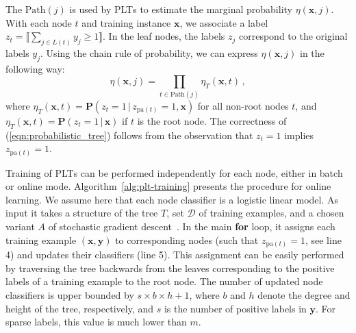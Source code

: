 \documentclass{article}
\newcommand{\Algo}[1]{\textsc{#1}}
\renewcommand{\vec}[1]{\boldsymbol{#1}}
\newcommand{\bx}{\vec{x}}
\newcommand{\by}{\vec{y}}
\newcommand{\calD}{\mathcal{D}}
\newcommand{\heta}{\hat{\eta}}
\newcommand{\pa}[1]{\mathrm{pa}(#1)}
\newcommand{\Path}[1]{\mathrm{Path}(#1)}
\newcommand{\prob}{\mathbf{P}}
\newcommand{\assert}[1]{\llbracket #1 \rrbracket}
\newcommand{\given}{\, | \,}
\begin{document}
{The $\Path{j}$ is used by \Algo{PLT}s to estimate the marginal probability $\eta(\bx, j)$.
With each node $t$ and training instance $\bx$, we associate a label $z_t = \assert{\textstyle \sum_{j \in L(t)} y_j \ge 1}$.
In the leaf nodes, the labels $z_j$ correspond to the original labels $y_j$.
Using the chain rule of probability, we can express $\eta(\bx, j)$ in the following way:
\begin{equation}
\eta(\bx, j) = \prod_{t \in \Path{j}} \eta_T(\bx, t)\,,
\label{eqn:probabilistic_tree}
\end{equation}
where $\eta_T(\bx, t) = \prob(z_t = 1 \given z_{\pa{t}} =1, \bx)$ for all non-root nodes $t$, and $\eta_T(\bx, t) = \prob(z_t = 1 \given \bx)$ if $t$ is the root node. 
The correctness of (\ref{eqn:probabilistic_tree}) follows from the observation that $z_{t} = 1$ implies $z_{\pa{t}} = 1$. %

Training of \Algo{PLT}s can be performed independently for each node, either in batch or online mode.  Algorithm~\ref{alg:plt-training} presents the procedure for online learning. We assume here that each node classifier is a logistic linear model. As input it takes a structure of the tree $T$, set $\calD$ of training examples, and a chosen variant $A$ of stochastic gradient descent~\cite{Bottou_2010}. In the main \textbf{for} loop, it assigns each training example $(\bx, \by)$ to corresponding nodes (such that  $z_{\pa{t}} = 1$, see line 4) and updates their classifiers (line 5). This assignment can be easily performed by traversing the tree backwards from the leaves corresponding to the positive labels of a training example to the root node. The number of updated node classifiers is upper bounded by $s \times b \times h+1$, where $b$ and $h$ denote the degree and height of the tree, respectively, and $s$ is the number of positive labels in $\by$. For sparse labels, this value is much lower than $m$.



}
\end{document}

